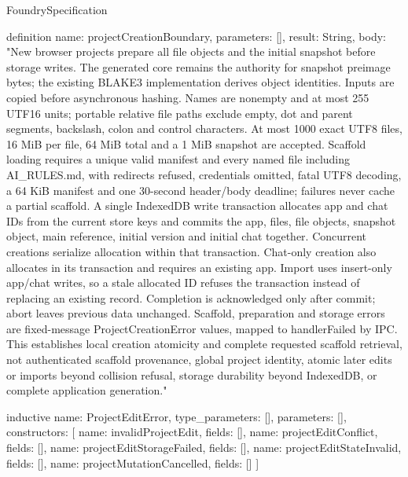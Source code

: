\begin{lexlean}{FoundrySpecification}
\begin{semanticmodule}
definition{
  name: projectCreationBoundary,
  parameters: [],
  result: String,
  body: "New browser projects prepare all file objects and the initial snapshot before storage writes. The generated core remains the authority for snapshot preimage bytes; the existing BLAKE3 implementation derives object identities. Inputs are copied before asynchronous hashing. Names are nonempty and at most 255 UTF16 units; portable relative file paths exclude empty, dot and parent segments, backslash, colon and control characters. At most 1000 exact UTF8 files, 16 MiB per file, 64 MiB total and a 1 MiB snapshot are accepted. Scaffold loading requires a unique valid manifest and every named file including AI_RULES.md, with redirects refused, credentials omitted, fatal UTF8 decoding, a 64 KiB manifest and one 30-second header/body deadline; failures never cache a partial scaffold. A single IndexedDB write transaction allocates app and chat IDs from the current store keys and commits the app, files, file objects, snapshot object, main reference, initial version and initial chat together. Concurrent creations serialize allocation within that transaction. Chat-only creation also allocates in its transaction and requires an existing app. Import uses insert-only app/chat writes, so a stale allocated ID refuses the transaction instead of replacing an existing record. Completion is acknowledged only after commit; abort leaves previous data unchanged. Scaffold, preparation and storage errors are fixed-message ProjectCreationError values, mapped to handlerFailed by IPC. This establishes local creation atomicity and complete requested scaffold retrieval, not authenticated scaffold provenance, global project identity, atomic later edits or imports beyond collision refusal, storage durability beyond IndexedDB, or complete application generation."
}

inductive{
  name: ProjectEditError,
  type_parameters: [],
  parameters: [],
  constructors: [
    {name: invalidProjectEdit, fields: []},
    {name: projectEditConflict, fields: []},
    {name: projectEditStorageFailed, fields: []},
    {name: projectEditStateInvalid, fields: []},
    {name: projectMutationCancelled, fields: []}
  ]
}


\end{semanticmodule}
\end{lexlean}
